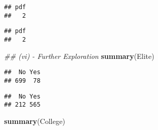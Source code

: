 \documentclass[]{article}
\newenvironment{Shaded}{\begin{snugshade}}{\end{snugshade}}
\newcommand{\CommentTok}[1]{\textcolor[rgb]{0.56,0.35,0.01}{\textit{#1}}}
\newcommand{\DataTypeTok}[1]{\textcolor[rgb]{0.13,0.29,0.53}{#1}}
\newcommand{\DecValTok}[1]{\textcolor[rgb]{0.00,0.00,0.81}{#1}}
\newcommand{\KeywordTok}[1]{\textcolor[rgb]{0.13,0.29,0.53}{\textbf{#1}}}
\newcommand{\NormalTok}[1]{#1}
\newcommand{\OperatorTok}[1]{\textcolor[rgb]{0.81,0.36,0.00}{\textbf{#1}}}
\newcommand{\StringTok}[1]{\textcolor[rgb]{0.31,0.60,0.02}{#1}}
\begin{document}
\begin{verbatim}
## pdf 
##   2
\end{verbatim}

\begin{Shaded}
\end{Shaded}

\begin{verbatim}
## pdf 
##   2
\end{verbatim}

\begin{Shaded}
\begin{Highlighting}[]
\CommentTok{## (vi) - Further Exploration}
\KeywordTok{summary}\NormalTok{(Elite)}
\end{Highlighting}
\end{Shaded}

\begin{verbatim}
##  No Yes 
## 699  78
\end{verbatim}

\begin{Shaded}
\end{Shaded}

\begin{verbatim}
##  No Yes 
## 212 565
\end{verbatim}

\begin{Shaded}
\begin{Highlighting}[]
\KeywordTok{summary}\NormalTok{(College)}
\end{Highlighting}
\end{Shaded}
\end{document}
